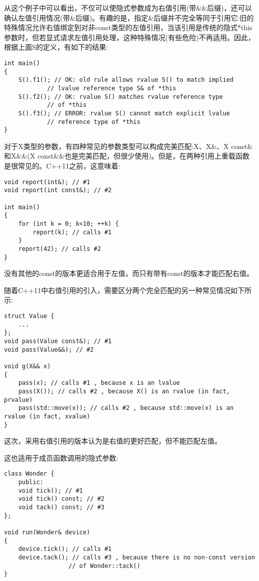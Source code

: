 从这个例子中可以看出，不仅可以使隐式参数成为右值引用(带\&\&后缀)，还可以确认左值引用情况(带\&后缀)。有趣的是，指定\&后缀并不完全等同于引用它:旧的特殊情况允许右值绑定到对非const类型的左值引用，当该引用是传统的隐式*this参数时，但若显式请求左值引用处理，这种特殊情况(有些危险)不再适用。因此，根据上面S的定义，有如下的结果:

\begin{lstlisting}[style=styleCXX]
int main()
{
	S().f1(); // OK: old rule allows rvalue S() to match implied
			// lvalue reference type S& of *this
	S().f2(); // OK: rvalue S() matches rvalue reference type
			// of *this
	S().f3(); // ERROR: rvalue S() cannot match explicit lvalue
			// reference type of *this
}
\end{lstlisting}



对于X类型的参数，有四种常见的参数类型可以构成完美匹配:X、X\&、X const\&和X\&\&(X const\&\&也是完美匹配，但很少使用)。但是，在两种引用上重载函数是很常见的。C++11之前，这意味着:

\begin{lstlisting}[style=styleCXX]
void report(int&); // #1
void report(int const&); // #2

int main()
{
	for (int k = 0; k<10; ++k) {
		report(k); // calls #1
	}
	report(42); // calls #2
}
\end{lstlisting}

没有其他的const的版本更适合用于左值，而只有带有const的版本才能匹配右值。

随着C++11中右值引用的引入，需要区分两个完全匹配的另一种常见情况如下所示:

\begin{lstlisting}[style=styleCXX]
struct Value {
	...
};
void pass(Value const&); // #1
void pass(Value&&); // #2

void g(X&& x)
{
	pass(x); // calls #1 , because x is an lvalue
	pass(X()); // calls #2 , because X() is an rvalue (in fact, prvalue)
	pass(std::move(x)); // calls #2 , because std::move(x) is an rvalue (in fact, xvalue)
}
\end{lstlisting}

这次，采用右值引用的版本认为是右值的更好匹配，但不能匹配左值。

这也适用于成员函数调用的隐式参数:

\begin{lstlisting}[style=styleCXX]
class Wonder {
	public:
	void tick(); // #1
	void tick() const; // #2
	void tack() const; // #3
};

void run(Wonder& device)
{
	device.tick(); // calls #1
	device.tack(); // calls #3 , because there is no non-const version
				  // of Wonder::tack()
}
\end{lstlisting}

